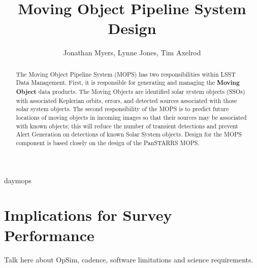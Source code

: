 \documentclass[12pt,preprint]{aastex}
\begin{document}
\title{Moving Object Pipeline System Design}

\author{Jonathan Myers, Lynne Jones, Tim Axelrod}

\begin{abstract}

The Moving Object Pipeline System (MOPS) has two responsibilities
within LSST Data Management.  First, it is responsible for generating
and managing the \textbf{Moving Object} data products.  The Moving
Objects are identified solar system objects (SSOs) with associated
Keplerian orbits, errors, and detected sources associated with those
solar system objects.  The second responsibility of the MOPS is to
predict future locations of moving objects in incoming images so that
their sources may be associated with known objects; this will reduce
the number of transient detections and prevent Alert Generation on
detections of known Solar System objects.  Design for the MOPS
component is based closely on the design of the PanSTARRS MOPS.

\end{abstract}

\tableofcontents




 {daymops}



\section{Implications for Survey Performance}
Talk here about OpSim, cadence, software limitations and science requirements.







\end{document}
